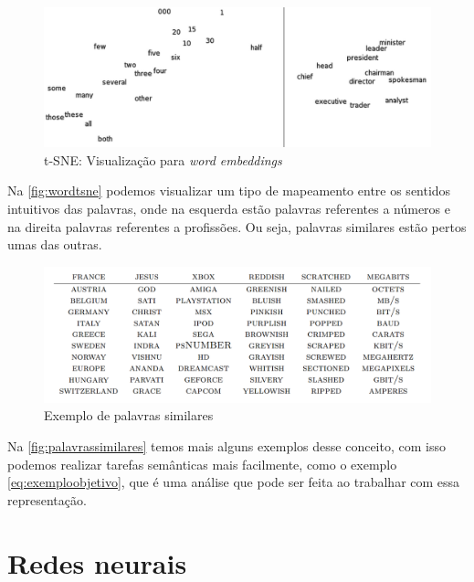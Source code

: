 \begin{figure}[htb]
  \caption{t-SNE: Visualização para \textit{word embeddings}}\label{fig:wordtsne}
  \begin{center}
      \includegraphics[scale=0.25]{img/Turian-WordTSNE}
  \end{center}
\end{figure}

Na \autoref{fig:wordtsne} podemos visualizar um tipo de mapeamento entre os sentidos intuitivos das palavras, onde na esquerda estão palavras referentes a números e na direita palavras referentes a profissões. Ou seja, palavras similares estão pertos umas das outras.

\begin{figure}[htb]
  \caption{Exemplo de palavras similares}\label{fig:palavrassimilares}
  \begin{center}
      \includegraphics[scale=0.35]{img/Colbert-WordTable2}
  \end{center}
\end{figure}

Na \autoref{fig:palavrassimilares} temos mais alguns exemplos desse conceito, com isso podemos realizar tarefas semânticas mais facilmente, como o exemplo \ref{eq:exemploobjetivo}, que é uma análise que pode ser feita ao trabalhar com essa representação.



\section{Redes neurais}\label{sec:redesneurais}

